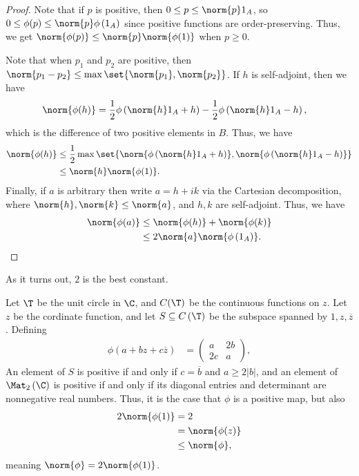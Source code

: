 \documentclass[10pt]{mypackage}
\begin{document}
\begin{proof}
  Note that if $p$ is positive, then $0\leq p \leq \norm{p}1_A$, so $0\leq \phi(p)\leq \norm{p}\phi\left( 1_A \right)$ since positive functions are order-preserving. Thus, we get $\norm{\phi(p)}\leq \norm{p}\norm{\phi(1)}$ when $p\geq 0$.\newline

  Note that when $p_1$ and $p_2$ are positive, then $\norm{p_1 - p_2}\leq \max\set{\norm{p_1},\norm{p_2}}$. If $h$ is self-adjoint, then we have
  \begin{align*}
    \norm{\phi(h)} &= \frac{1}{2}\phi\left( \norm{h}1_A + h \right) - \frac{1}{2}\phi\left( \norm{h}1_A - h \right),
  \end{align*}
  which is the difference of two positive elements in $B$. Thus, we have
  \begin{align*}
    \norm{\phi(h)} &\leq \frac{1}{2}\max\set{\norm{\phi\left( \norm{h}1_A + h \right)},\norm{\phi\left( \norm{h}1_A - h \right)}}\\
                   &\leq \norm{h}\norm{\phi(1)}.
  \end{align*}
  Finally, if $a$ is arbitrary then write $a = h + ik$ via the Cartesian decomposition, where $\norm{h},\norm{k}\leq \norm{a}$, and $h,k$ are self-adjoint. Thus, we have
  \begin{align*}
    \norm{\phi(a)} &\leq \norm{\phi(h)} + \norm{\phi(k)}\\
                   &\leq 2\norm{a}\norm{\phi\left(1_A\right)}.
  \end{align*}
\end{proof}
As it turns out, $2$ is the best constant.
\begin{example}
  Let $\T$ be the unit circle in $\C$, and $C(\T)$ be the continuous functions on $z$. Let $z$ be the cordinate function, and let $S\subseteq C\left( \T \right)$ be the subspace spanned by $1,z,\overline{z}$. Defining
  \begin{align*}
    \phi\left( a + bz + c\overline{z} \right) &= \begin{pmatrix}a & 2b \\ 2c & a\end{pmatrix},
  \end{align*}
  An element of $S$ is positive if and only if $c = \overline{b}$ and $a \geq 2\left\vert b \right\vert$, and an element of $\Mat_2\left( \C \right)$ is positive if and only if its diagonal entries and determinant are nonnegative real numbers. Thus, it is the case that $\phi$ is a positive map, but also 
  \begin{align*}
    2\norm{\phi(1)} &= 2\\
                    &= \norm{\phi(z)}\\
                    &\leq \norm{\phi},
  \end{align*}
  meaning $\norm{\phi} = 2\norm{\phi(1)}$.
\end{example}
\end{document}
